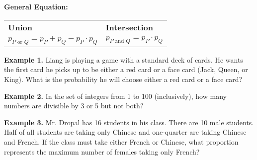 \documentclass[12pt]{article}
\begin{document}
\bigskip
\textbf{General Equation:}

\begin{tabularx}{\textwidth}{*2{@{}>{\centering\arraybackslash}X}}
\textbf{\large Union} & \textbf{\large Intersection}\\
$p_{P\mbox{ or }Q} = p_P+p_Q-p_P\cdot p_Q$ & $p_{P\mbox{ and }Q} = p_P\cdot p_Q$
\end{tabularx}

\vfill
\textbf{Example 1.} Liang is playing a game with a standard deck of cards. He wants the first card he picks up to be either a red card or a face card (Jack, Queen, or King). What is the probability he will choose either a red card or a face card?

\vfill
\textbf{Example 2.} In the set of integers from 1 to 100 (inclusively), how many numbers are divisible by 3 or 5 but not both?

\vfill
\textbf{Example 3.} Mr. Dropal has 16 students in his class. There are 10 male students. Half of all students are taking only Chinese and one-quarter are taking Chinese and French. If the class must take either French or Chinese, what proportion represents the maximum number of females taking only French?
\end{document}
